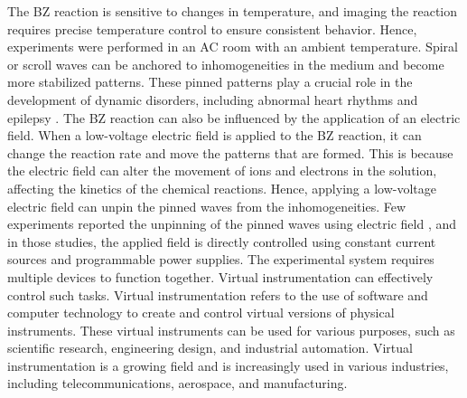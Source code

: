 \documentclass[journal=jacsat,manuscript=article]{achemso}
\begin{document}
The BZ reaction is sensitive to changes in temperature, and imaging the reaction requires precise temperature control to ensure consistent behavior. Hence, experiments were performed in an AC room with an ambient temperature.
Spiral or scroll waves can be anchored to inhomogeneities in the medium and become more stabilized patterns. These pinned patterns play a crucial role in the development of dynamic disorders, including abnormal heart rhythms \cite{bruser2012automatic} \cite{kundu2021amplitude} and epilepsy \cite{punacha2020theory}. The BZ reaction can also be influenced by the application of an electric field. When a low-voltage electric field is applied to the BZ reaction, it can change the reaction rate and move the patterns that are formed. This is because the electric field can alter the movement of ions and electrons in the solution, affecting the kinetics of the chemical reactions. Hence, applying a low-voltage electric field can unpin the pinned waves from the inhomogeneities. Few experiments reported the unpinning of the pinned waves using electric field \cite{steinbock1992electric}\cite{ji2013experimental}\cite{jimenez2013electric}\cite{sutthiopad2014unpinning}\cite{porjai2016electrically}, and in those studies, the applied field is directly controlled using constant current sources and programmable power supplies. The experimental system requires multiple devices to function together. 
Virtual instrumentation can effectively control such tasks. Virtual instrumentation refers to the use of software and computer technology to create and control virtual versions of physical instruments. These virtual instruments can be used for various purposes, such as scientific research, engineering design, and industrial automation. 
Virtual instrumentation is a growing field and is increasingly used in various industries, including telecommunications, aerospace, and manufacturing.
\end{document}
